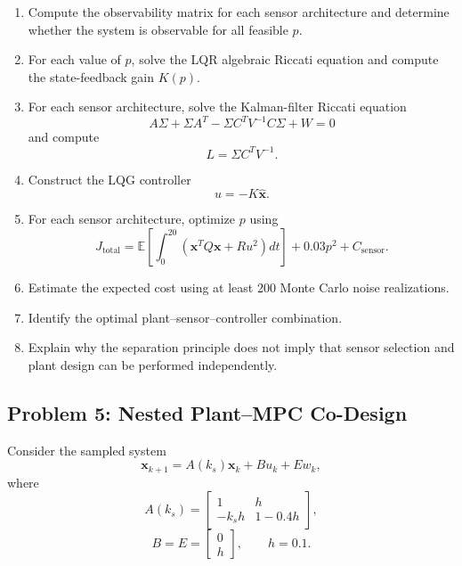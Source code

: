 \begin{enumerate}
    \item Compute the observability matrix for each sensor architecture and
    determine whether the system is observable for all feasible $p$.

    \item For each value of $p$, solve the LQR algebraic Riccati equation and
    compute the state-feedback gain $K(p)$.

    \item For each sensor architecture, solve the Kalman-filter Riccati equation
    \begin{equation}
    A\Sigma+\Sigma A^T
    -
    \Sigma C^TV^{-1}C\Sigma
    +
    W=0
    \end{equation}
    and compute
    \begin{equation}
    L=\Sigma C^TV^{-1}.
    \end{equation}

    \item Construct the LQG controller
    \begin{equation}
    u=-K\hat{\mathbf{x}}.
    \end{equation}

    \item For each sensor architecture, optimize $p$ using
    \begin{equation}
    J_{\mathrm{total}}
    =
    \mathbb{E}
    \left[
    \int_0^{20}
    \left(
    \mathbf{x}^TQ\mathbf{x}
    +
    Ru^2
    \right)dt
    \right]
    +
    0.03p^2
    +
    C_{\mathrm{sensor}}.
    \end{equation}

    \item Estimate the expected cost using at least 200 Monte Carlo
    noise realizations.

    \item Identify the optimal plant--sensor--controller combination.

    \item Explain why the separation principle does not imply that sensor
    selection and plant design can be performed independently.
\end{enumerate}


\subsection*{Problem 5: Nested Plant--MPC Co-Design}

Consider the sampled system
\begin{equation}
\mathbf{x}_{k+1}
=
A(k_s)\mathbf{x}_k
+
Bu_k
+
Ew_k,
\end{equation}
where
\begin{equation}
A(k_s)=
\begin{bmatrix}
1&h\\
-k_sh&1-0.4h
\end{bmatrix},
\end{equation}
\begin{equation}
B=E=
\begin{bmatrix}
0\\
h
\end{bmatrix},
\qquad
h=0.1.
\end{equation}

